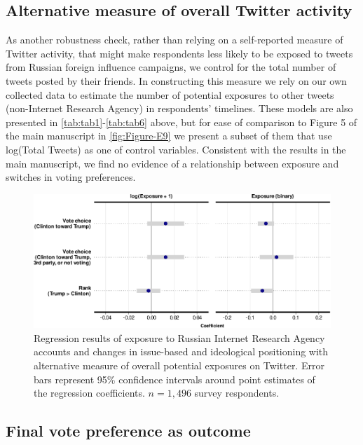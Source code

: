 \documentclass[
  12pt,
]{article}
\begin{document}
\clearpage

\hypertarget{alternative-measure-of-overall-twitter-activity}{%
\subsection{Alternative measure of overall Twitter activity}\label{alternative-measure-of-overall-twitter-activity}}

As another robustness check, rather than relying on a self-reported measure of Twitter activity, that might make respondents less likely to be exposed to tweets from Russian foreign influence campaigns, we control for the total number of tweets posted by their friends. In constructing this measure we rely on our own collected data to estimate the number of potential exposures to other tweets (non-Internet Research Agency) in respondents' timelines. These models are also presented in \ref{tab:tab1}-\ref{tab:tab6} above, but for ease of comparison to Figure 5 of the main manuscript in \autoref{fig:Figure-E9} we present a subset of them that use log(Total Tweets) as one of control variables. Consistent with the results in the main manuscript, we find no evidence of a relationship between exposure and switches in voting preferences.

\begin{figure}
\centering
\includegraphics{Appendix_files/figure-latex/Figure-E9-1.pdf}
\caption{\label{fig:Figure-E9}Regression results of exposure to Russian Internet Research Agency accounts and changes in issue-based and ideological positioning with alternative measure of overall potential exposures on Twitter. Error bars represent 95\% confidence intervals around point estimates of the regression coefficients. \(n = 1,496\) survey respondents.}
\end{figure}

\clearpage

\hypertarget{final-vote-preference-as-outcome}{%
\subsection{Final vote preference as outcome}\label{final-vote-preference-as-outcome}}
\end{document}
